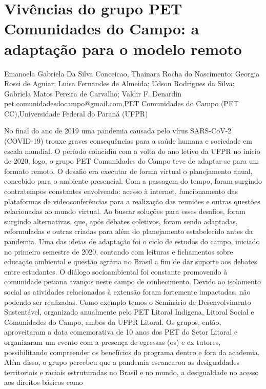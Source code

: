 

\section{Vivências do grupo PET Comunidades do Campo: a adaptação para o modelo remoto }

Emanoela Gabriela Da Silva Conceicao, Thainara Rocha do Nascimento; Georgia Rossi de Aguiar; Luisa Fernandes de Almeida; Udson Rodrigues da Silva; Gabriela Matos Pereira de Carvalho; Valdir F. Denardin  pet.comunidadesdocampo@gmail.com,PET Comunidades do Campo (PET CC),Universidade Federal do Paraná (UFPR)

No final do ano de 2019 uma pandemia causada pelo vírus SARS-CoV-2 (COVID-19)
trouxe graves consequências para a saúde humana e sociedade em escala mundial. O período
coincidiu com a volta do ano letivo da UFPR no início de 2020, logo, o grupo PET Comunidades
do Campo teve de adaptar-se para um formato remoto. O desafio era executar de forma virtual o
planejamento anual, concebido para o ambiente presencial. Com a passagem do tempo, foram
surgindo contratempos constantes envolvendo: acesso à internet, funcionamento das plataformas
de videoconferências para a realização das reuniões e outras questões relacionadas ao mundo
virtual. Ao buscar soluções para esses desafios, foram surgindo alternativas, que, após debates
coletivos, foram sendo adaptadas, reformuladas e outras criadas para além do planejamento
estabelecido antes da pandemia.
Uma das ideias de adaptação foi o ciclo de estudos do campo, iniciado no primeiro
semestre de 2020, contando com leituras e fichamentos sobre educação ambiental e questão
agrária no Brasil a fim de dar suporte aos debates entre estudantes. O diálogo socioambiental foi
constante promovendo à comunidade petiana avanços neste campo de conhecimento.
Devido ao isolamento social as atividades relacionadas à extensão foram fortemente
impactadas, não podendo ser realizadas. Como exemplo temos o Seminário de Desenvolvimento
Sustentável, organizado anualmente pelo PET Litoral Indigena, Litoral Social e Comunidades do
Campo, ambos da UFPR Litoral. Os grupos, então, aproveitaram a data comemorativa de 10
anos dos PET do Setor Litoral e organizaram um evento com a presença de egressas (os) e ex
tutores, possibilitando compreender os benefícios do programa dentro e fora da academia.
Além disso, o grupo percebeu que a pandemia escancarou as desigualdades territoriais e
raciais estruturadas no Brasil e no mundo, a desigualdade no acesso aos direitos básicos como
